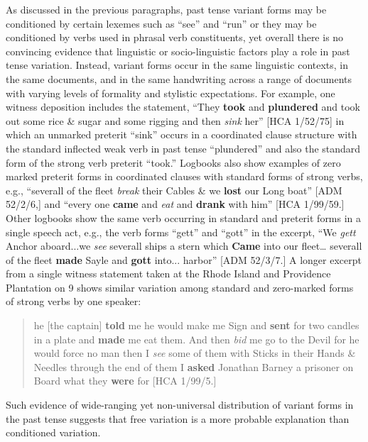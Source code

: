 As discussed in the previous paragraphs, past tense variant forms may be conditioned by certain lexemes such as “see” and “run” or they may be conditioned by verbs used in phrasal verb constituents, yet overall there is no convincing evidence that linguistic or socio-linguistic factors play a role in past tense variation. Instead, variant forms occur in the same linguistic contexts, in the same documents, and in the same handwriting across a range of documents with varying levels of formality and stylistic expectations. For example, one witness deposition includes the statement, “They \textbf{took} and \textbf{plundered} and took out some rice \& sugar and some rigging and then \textit{sink} her” [HCA 1/52/75] in which an unmarked preterit “sink” occurs in a coordinated clause structure with the standard inflected weak verb in past tense “plundered” and also the standard form of the strong verb preterit “took.” Logbooks also show examples of zero marked preterit forms in coordinated clauses with standard forms of strong verbs, e.g., “severall of the fleet \textit{break} their Cables \& we \textbf{lost} our Long boat” [ADM 52/2/6,] and “every one \textbf{came} and \textit{eat} and \textbf{drank} with him” [HCA 1/99/59.] Other logbooks show the same verb occurring in standard and preterit forms in a single speech act, e.g., the verb forms “gett” and “gott” in the excerpt, “We \textit{gett} Anchor aboard...we \textit{see} severall ships a stern which \textbf{Came} into our fleet… severall of the fleet \textbf{made} Sayle and \textbf{gott} into... harbor” [ADM 52/3/7.] A longer excerpt from a single witness statement taken at the Rhode Island and Providence Plantation on 9 \citealt{September1725} shows similar variation among standard and zero-marked forms of strong verbs by one speaker:

\begin{quotation}
he [the captain] \textbf{told} me he would make me Sign and \textbf{sent} for two candles in a plate and \textbf{made} me eat them. And then \textit{bid} me go to the Devil for he would force no man then I \textit{see} some of them with Sticks in their Hands \& Needles through the end of them I \textbf{asked} Jonathan Barney a prisoner on Board what they \textbf{were} for [HCA 1/99/5.]\end{quotation}

Such evidence of wide-ranging yet non-universal distribution of variant forms in the past tense suggests that free variation is a more probable explanation than conditioned variation.

